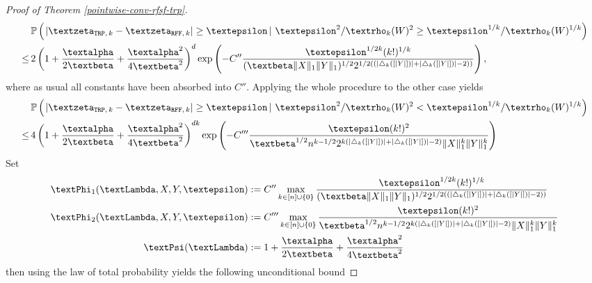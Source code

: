 \documentclass[openany]{book}
\begin{document}
\begin{proof}[Proof of Theorem \ref{pointwise-conv-rfsf-trp}]
        \begin{equation*}
        \begin{split}
            &\,\mathbb P\left(\left.\vert \gzeta_{\mathtt{TRP},\,k}-\gzeta_{\mathtt{RFF},\,k}\vert \geq \gepsilon\,\right\vert\,\gepsilon^2/\grho_k(W)^2\geq \gepsilon^{1/k}/\grho_k(W)^{1/k}\right)\\\leq&\,2\left(1+\frac{\galpha}{2\gbeta}+\frac{\galpha^2}{4\gbeta^2}\right)^{d}\exp\left(-C{''}\frac{\gepsilon^{1/2k}(k!)^{1/k}}{(\gbeta\|X\|_1\|Y\|_1)^{1/2}2^{1/2((\vert\triangle_k([\vert Y\vert ]) \vert +\vert \triangle_k([\vert Y\vert ])\vert -2))}}\right),
        \end{split}
        \end{equation*}
        where as usual all constants have been absorbed into $C''$. Applying the whole procedure to the other case yields 
        \begin{equation*}
            \begin{split}
                &\,\mathbb P\left(\left.\vert \gzeta_{\mathtt{TRP},\,k}-\gzeta_{\mathtt{RFF},\,k}\vert \geq \gepsilon\,\right\vert\,\gepsilon^2/\grho_k(W)^2< \gepsilon^{1/k}/\grho_k(W)^{1/k}\right)\\\leq&\,4\left(1+\frac{\galpha}{2\gbeta}+\frac{\galpha^2}{4\gbeta^2}\right)^{dk}\exp\left(-C'''\frac{\gepsilon(k!)^2}{\gbeta^{1/2}n^{k-1/2}2^{k(\vert\triangle_k([\vert Y\vert ]) \vert +\vert \triangle_k([\vert Y\vert ])\vert -2)}\|X\|_1^k\|Y\|^k_{1}}\right)
            \end{split}
        \end{equation*}
        Set 
        \begin{equation}\label{constants-rfsf-trp}
        \begin{split}
            \gPhi_1(\gLambda, X,Y,\gepsilon)&:=C{''}\max_{k\in [n]\cup\{0\}}\frac{\gepsilon^{1/2k}(k!)^{1/k}}{(\gbeta\|X\|_1\|Y\|_1)^{1/2}2^{1/2((\vert\triangle_k([\vert Y\vert ]) \vert +\vert \triangle_k([\vert Y\vert ])\vert -2))}}\\
            \gPhi_2(\gLambda, X,Y,\gepsilon)&:=C'''\max_{k\in [n]\cup\{0\}}\frac{\gepsilon(k!)^2}{\gbeta^{1/2}n^{k-1/2}2^{k(\vert\triangle_k([\vert Y\vert ]) \vert +\vert \triangle_k([\vert Y\vert ])\vert -2)}\|X\|_1^k\|Y\|^k_{1}}
            \\\gPsi(\gLambda)&:=1+\frac{\galpha}{2\gbeta}+\frac{\galpha^2}{4\gbeta^2}
        \end{split}
        \end{equation}
        then using the law of total probability yields the following unconditional bound

\end{proof}
\end{document}
